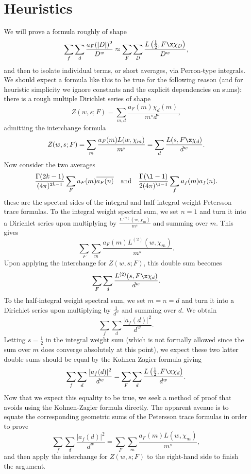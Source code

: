 \documentclass[12pt]{article}
\begin{document}
\section{Heuristics}
    We will prove a formula roughly of shape
    \[
      \sum_{f}\sum_{d}\frac{a_{F}(|D|)^{2}}{D^{w}} \approx \sum_{F}\sum_{D}\frac{L\left(\frac{1}{2},F \x \chi_{D}\right)}{D^{w}},
    \]
    and then to isolate individual terms, or short averages, via Perron-type integrals. We should expect a formula like this to be true for the following reason (and for heuristic simplicity we ignore constants and the explicit dependencies on sums): there is a rough multiple Dirichlet series of shape
    \[
      Z(w,s;F) = \sum_{m,d}\frac{a_{F}(m)\chi_{d}(m)}{m^{s}d^{w}},
    \]
    admitting the interchange formula
    \[
      Z(w,s;F) = \sum_{m}\frac{a_{F}(m)L(w,\chi_{m})}{m^{s}} = \sum_{d}\frac{L(s,F \x \chi_{d})}{d^{w}}.
    \]
    Now consider the two averages
    \[
      \frac{\Gamma(2k-1)}{(4\pi)^{2k-1}}\sum_{F}a_{F}(m)\overline{a_{F}(n)} \quad \text{and} \quad \frac{\Gamma(\l-1)}{2(4\pi)^{\l-1}}\sum_{f}a_{f}(m)a_{f}(n).
    \]
    these are the spectral sides of the integral and half-integral weight Petersson trace formulas. To the integral weight spectral sum, we set \(n = 1\) and turn it into a Dirichlet series upon multiplying by \(\frac{L^{(2)}(w,\chi_{m})}{m^{s}}\) and summing over \(m\). This gives
    \[
      \sum_{F}\sum_{m}\frac{a_{F}(m)L^{(2)}(w,\chi_{m})}{m^{s}}.
    \]
    Upon applying the interchange for \(Z(w,s;F)\), this double sum becomes
    \[
      \sum_{F}\sum_{d}\frac{L^{(2)}(s,F \x \chi_{d})}{d^{w}}.
    \]
    To the half-integral weight spectral sum, we set \(m = n = d\) and turn it into a Dirichlet series upon multiplying by \(\frac{1}{d^{w}}\) and summing over \(d\). We obtain
    \[
      \sum_{f}\sum_{d}\frac{|a_{f}(d)|^{2}}{d^{w}}.
    \]
    Letting \(s = \frac{1}{2}\) in the integral weight sum (which is not formally allowed since the sum over \(m\) does converge absolutely at this point), we expect these two latter double sums should be equal by the Kohnen-Zagier formula giving 
    \[
      \sum_{f}\sum_{d}\frac{|a_{f}(d)|^{2}}{d^{w}} = \sum_{F}\sum_{d}\frac{L\left(\frac{1}{2},F \x \chi_{d}\right)}{d^{w}}.
    \]
    Now that we expect this equality to be true, we seek a method of proof that avoids using the Kohnen-Zagier formula directly. The apparent avenue is to equate the corresponding geometric sums of the Petersson trace formulas in order to prove
    \[
      \sum_{f}\sum_{d}\frac{|a_{f}(d)|^{2}}{d^{w}} = \sum_{F}\sum_{m}\frac{a_{F}(m)L(w,\chi_{m})}{m^{s}},
    \]
    and then apply the interchange for \(Z(w,s;F)\) to the right-hand side to finish the argument.
\end{document}
